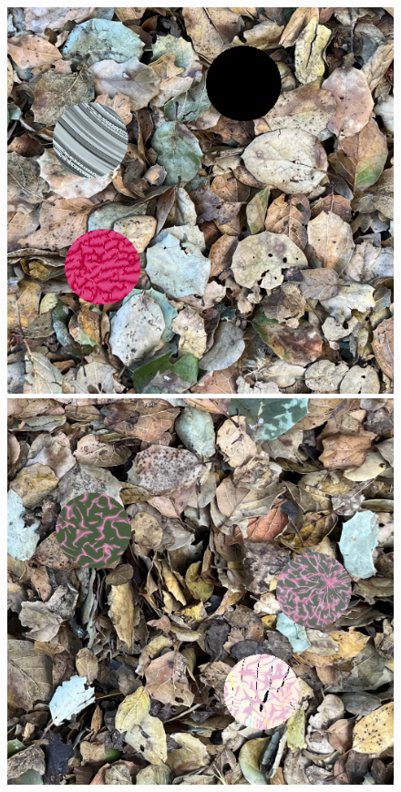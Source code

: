 \documentclass[sigconf]{acmart}
\begin{document}
\maketitle

\begin{figure}
    \includegraphics[scale=0.16]{images/20221016_step_969.png}
    \hfill
    \includegraphics[scale=0.16]{images/20221016_step_1710.png}

\end{figure}
\end{document}
